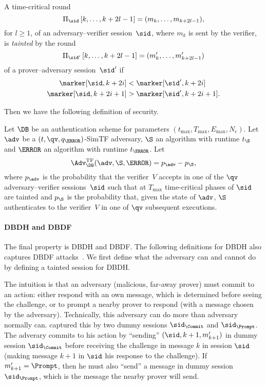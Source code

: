 \begin{definition}\label{TaintedTF}
  A time-critical round
  \[\Xscript{\sid}{k, \dotsc, k+2l-1} = (m_k, \dotsc, m_{k+2l-1}),\] for 
  \(l\geq 1\), of an adversary--verifier session~\(\sid\), where \(m_k\) is 
  sent by the verifier, is \emph{tainted} by the round
  \[\Xscript{\sid'}{k, \dotsc, k+2l-1} = (m'_{k}, \dotsc, m'_{k+2l-1})\]
  of a prover--adversary session~\(\sid'\) if
  \begin{align*}
    \marker[\sid, k+2i] &< \marker[\sid', k+2i] \\
    \marker[\sid, k+2i+1] &> \marker[\sid', k+2i+1].
  \end{align*}
\end{definition}

Then we have the following definition of security.

\begin{definition}%
  \label{TFresistance}
  Let \(\DB\) be an authentication scheme for parameters \((t_{\max}, T_{\max}, 
    E_{\max}, N_c)\).
  Let \(\adv\) be a \((t, \qv, q_{\F})\)-SimTF adversary, \(\S\) an algorithm 
  with runtime \(t_{\S}\) and \(\F\) an algorithm with runtime \(t_{\F}\).
  Let \[
    \Adv_{\DB}^{\text{TF}}(\adv, \S, \F) = p_{\adv} - p_{\S},
  \] where \(p_{\adv}\) is the probability that the verifier~\(V\) accepts in 
  one of the \(\qv\) adversary--verifier sessions~\(\sid\) such that at 
  \(T_{\max}\) time-critical phases of \(\sid\) are tainted and \(p_{\S}\) is 
  the probability that, given the state of \(\adv\), \(\S\) authenticates to 
  the verifier~\(V\) in one of \(\qv\) subsequent executions.
\end{definition}

\paragraph*{\Acl*{DBDH} and \acl*{DBDF}}

The final property is \ac{DBDH} and \ac{DBDF}.
The following definitions for \ac{DBDH} also captures \ac{DBDF} 
attacks~\cite{TREAD}.
We first define what the adversary can and cannot do by defining a tainted 
session for \ac{DBDH}.

The intuition is that an adversary (malicious, far-away prover) must commit to 
an action: either respond with an own message, which is determined before 
seeing the challenge, or to prompt a nearby prover to respond (with a message 
chosen by the adversary).
Technically, this adversary can do more than  adversary normally can.
\Textcite{TREAD} captured this by two dummy sessions \(\sid_{\Commit}\) and 
\(\sid_{\Prompt}\).
The adverary commits to his action by \enquote{sending} \((\sid, k+1, 
m'_{k+1})\) in dummy session \(\sid_{\Commit}\) before receiving the challenge 
in message \(k\) in session \(\sid\) (making message \(k+1\) in \(\sid\) his 
response to the challenge).
If \(m'_{k+1} = \Prompt\), then he must also \enquote{send} a message in dummy 
session \(\sid_{\Prompt}\), which is the message the nearby prover will send.

